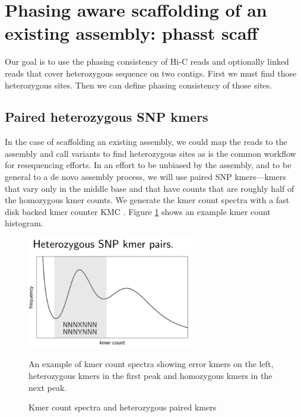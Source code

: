 \section{Phasing aware scaffolding of an existing assembly: phasst scaff}

\par{
Our goal is to use the phasing consistency of Hi-C reads and optionally linked reads that cover heterozygous sequence on two contigs. First we must find those heterozygous sites. Then we can define phasing consistency of those sites.
}


\subsection{Paired heterozygous SNP kmers}
\par{
In the case of scaffolding an existing assembly, we could map the reads to the assembly and call variants to find heterozygous sites as is the common workflow for resequencing efforts. In an effort to be unbiased by the 
assembly, and to be general to a de novo assembly process, we will use paired SNP kmers---kmers that vary only in the middle base and that have counts that are roughly half of the homozygous kmer counts. We generate the 
kmer count spectra with a fast disk backed kmer counter KMC \cite{kmc}\cite{kmc2}\cite{kmc3}. Figure \ref{figure:kmc} shows an example kmer count histogram. 
}

\begin{figure}[htbp!]

\caption{Kmer count spectra and heterozygous paired kmers}
\label{figure:kmc}
\begin{centering}
\includegraphics[width=0.65\textwidth]{kmc.png}
\par{An example of kmer count spectra showing error kmers on the left, heterozygous kmers in the first peak and homozygous kmers in the next peak.}
\end{centering}
\end{figure}


